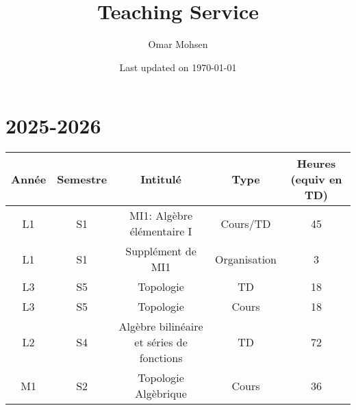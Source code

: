 \documentclass[a4paper, 13pt]{article}
\begin{document}
\title{Teaching Service}
\author{Omar Mohsen
}
\date{Last updated on \today}
\maketitle
\section*{2025-2026}
\begin{center}
\begin{tabular}{ |c|c|c|c|c| } 
 \hline
 Année & Semestre & Intitulé & Type & Heures (equiv en TD)\\ \hline
   L1 & S1 & MI1: Algèbre élémentaire I  & Cours/TD & 45\\
    L1 & S1 & Supplément de MI1  & Organisation & 3\\
    L3 & S5 & Topologie & TD & 18\\ 
        L3 & S5 & Topologie & Cours & 18\\
        L2 & S4 & Algèbre bilinéaire et séries de fonctions & TD & 72\\
        M1 & S2 & Topologie Algèbrique & Cours & 36\\ 
   \hline
\end{tabular}
\end{center}
\end{document}
